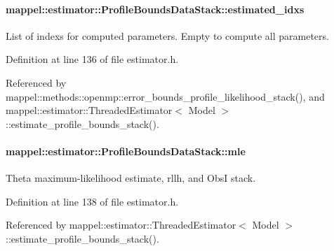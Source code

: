 \paragraph[{\texorpdfstring{estimated\+\_\+idxs}{estimated_idxs}}]{ mappel\+::estimator\+::\+Profile\+Bounds\+Data\+Stack\+::estimated\+\_\+idxs}\hypertarget{structmappel_1_1estimator_1_1ProfileBoundsDataStack_a695c3ae49b7d9aa845cf727c269abbd4}{}\label{structmappel_1_1estimator_1_1ProfileBoundsDataStack_a695c3ae49b7d9aa845cf727c269abbd4}


List of indexs for computed parameters. Empty to compute all parameters. 



Definition at line 136 of file estimator.\+h.



Referenced by mappel\+::methods\+::openmp\+::error\+\_\+bounds\+\_\+profile\+\_\+likelihood\+\_\+stack(), and mappel\+::estimator\+::\+Threaded\+Estimator$<$ Model $>$\+::estimate\+\_\+profile\+\_\+bounds\+\_\+stack().

\paragraph[{\texorpdfstring{mle}{mle}}]{ mappel\+::estimator\+::\+Profile\+Bounds\+Data\+Stack\+::mle}\hypertarget{structmappel_1_1estimator_1_1ProfileBoundsDataStack_a2960e31d721096fd44d5ca4dd652a5a9}{}\label{structmappel_1_1estimator_1_1ProfileBoundsDataStack_a2960e31d721096fd44d5ca4dd652a5a9}


Theta maximum-\/likelihood estimate, rllh, and ObsI stack. 



Definition at line 138 of file estimator.\+h.



Referenced by mappel\+::estimator\+::\+Threaded\+Estimator$<$ Model $>$\+::estimate\+\_\+profile\+\_\+bounds\+\_\+stack().


